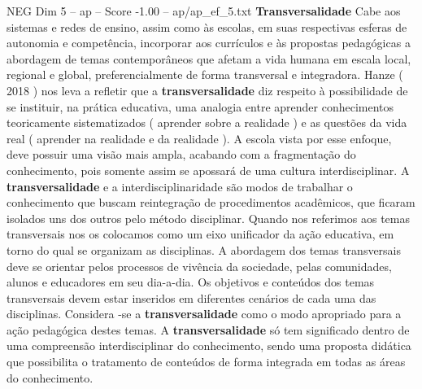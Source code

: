 \begin{textsample}{NEG Dim 5 – ap – Score -1.00 – ap/ap\_ef\_5.txt}  \label{ex:f5_neg_122}
\textbf{Transversalidade} Cabe aos sistemas e redes de ensino, assim como às escolas, em suas respectivas esferas de autonomia e competência, incorporar aos currículos e às propostas pedagógicas a abordagem de temas contemporâneos que afetam a vida humana em escala local, regional e global, preferencialmente de forma transversal e integradora.
Hanze ( 2018 ) nos leva a refletir que a \textbf{transversalidade} diz respeito à possibilidade de se instituir, na prática educativa, uma analogia entre aprender conhecimentos teoricamente sistematizados ( aprender sobre a realidade ) e as questões da vida real ( aprender na realidade e da realidade ).
A escola vista por esse enfoque, deve possuir uma visão mais ampla, acabando com a fragmentação do conhecimento, pois somente assim se apossará de uma cultura interdisciplinar.
A \textbf{transversalidade} e a interdisciplinaridade são modos de trabalhar o conhecimento que buscam reintegração de procedimentos acadêmicos, que ficaram isolados uns dos outros pelo método disciplinar.
Quando nos referimos aos temas transversais nos os colocamos como um eixo unificador da ação educativa, em torno do qual se organizam as disciplinas.
A abordagem dos temas transversais deve se orientar pelos processos de vivência da sociedade, pelas comunidades, alunos e educadores em seu dia-a-dia.
Os objetivos e conteúdos dos temas transversais devem estar inseridos em diferentes cenários de cada uma das disciplinas.
Considera -se a \textbf{transversalidade} como o modo apropriado para a ação pedagógica destes temas.
A \textbf{transversalidade} só tem significado dentro de uma compreensão interdisciplinar do conhecimento, sendo uma proposta didática que possibilita o tratamento de conteúdos de forma integrada em todas as áreas do conhecimento.

\end{textsample}
